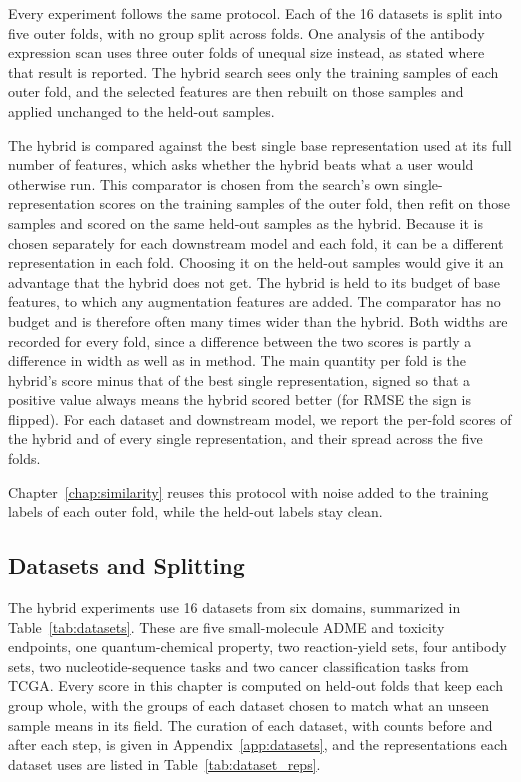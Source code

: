 Every experiment follows the same protocol. Each of the 16 datasets is split into five outer folds, with no group split across folds. One analysis of the antibody expression scan uses three outer folds of unequal size instead, as stated where that result is reported. The hybrid search sees only the training samples of each outer fold, and the selected features are then rebuilt on those samples and applied unchanged to the held-out samples.

The hybrid is compared against the best single base representation used at its full number of features, which asks whether the hybrid beats what a user would otherwise run. This comparator is chosen from the search's own single-representation scores on the training samples of the outer fold, then refit on those samples and scored on the same held-out samples as the hybrid. Because it is chosen separately for each downstream model and each fold, it can be a different representation in each fold. Choosing it on the held-out samples would give it an advantage that the hybrid does not get. The hybrid is held to its budget of base features, to which any augmentation features are added. The comparator has no budget and is therefore often many times wider than the hybrid. Both widths are recorded for every fold, since a difference between the two scores is partly a difference in width as well as in method. The main quantity per fold is the hybrid's score minus that of the best single representation, signed so that a positive value always means the hybrid scored better (for RMSE the sign is flipped). For each dataset and downstream model, we report the per-fold scores of the hybrid and of every single representation, and their spread across the five folds.

Chapter~\ref{chap:similarity} reuses this protocol with noise added to the training labels of each outer fold, while the held-out labels stay clean.


\subsection{Datasets and Splitting}

The hybrid experiments use 16 datasets from six domains, summarized in Table~\ref{tab:datasets}. These are five small-molecule ADME and toxicity endpoints, one quantum-chemical property, two reaction-yield sets, four antibody sets, two nucleotide-sequence tasks and two cancer classification tasks from TCGA. Every score in this chapter is computed on held-out folds that keep each group whole, with the groups of each dataset chosen to match what an unseen sample means in its field. The curation of each dataset, with counts before and after each step, is given in Appendix~\ref{app:datasets}, and the representations each dataset uses are listed in Table~\ref{tab:dataset_reps}.

